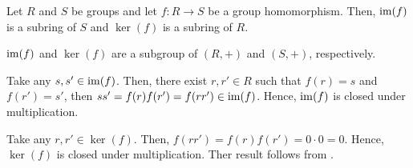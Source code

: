 \documentclass[../modern_algebra.tex]{subfiles}
\begin{document}
\begin{Theorem}{\textsf{}}{}
    Let \(R\) and \(S\) be groups and let \(f \colon R \to S\)
    be a group homomorphism.
    Then, \(\operatorname{im}(f)\) is a subring of \(S\) and \(\ker(f)\) is a subring of \(R\).
\end{Theorem}
\begin{myproof}[Proof]
    \(\operatorname{im}(f)\) and \(\ker(f)\) are a subgroup of \((R, +)\) and \((S, +)\), respectively.

    Take any \(s, s' \in \operatorname{im}(f)\). Then, there exist \(r, r' \in R\)
    such that \(f(r) = s\) and \(f(r') = s'\),
    then \(s s' = f(r) f(r') = f(r r') \in \operatorname{im}(f)\). Hence, \(\operatorname{im}(f)\) is closed under
    multiplication.

    Take any \(r, r' \in \ker(f)\).
    Then, \(f(r r') = f(r) f(r') = 0 \cdot 0 = 0\). Hence, \(\ker(f)\)
    is closed under multiplication. Ther result follows from .
\end{myproof}
\end{document}
